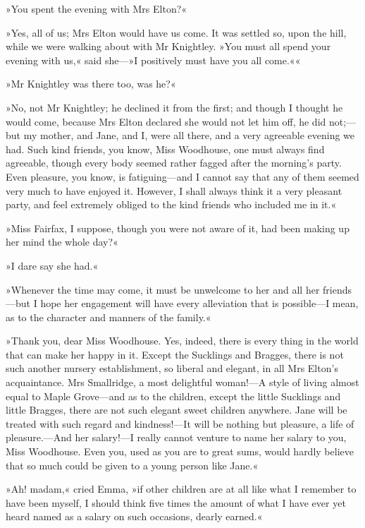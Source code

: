 »You spent the evening with Mrs Elton?«

»Yes, all of us; Mrs Elton would have us come. It was settled so, upon the hill, while we were walking about with Mr Knightley. »You must all spend your evening with us,« said she—»I positively must have you all come.««

»Mr Knightley was there too, was he?«

»No, not Mr Knightley; he declined it from the first; and though I thought he would come, because Mrs Elton declared she would not let him off, he did not;—but my mother, and Jane, and I, were all there, and a very agreeable evening we had. Such kind friends, you know, Miss Woodhouse, one must always find agreeable, though every body seemed rather fagged after the morning's party. Even pleasure, you know, is fatiguing—and I cannot say that any of them seemed very much to have enjoyed it. However, I shall always think it a very pleasant party, and feel extremely obliged to the kind friends who included me in it.«

»Miss Fairfax, I suppose, though you were not aware of it, had been making up her mind the whole day?«

»I dare say she had.«

»Whenever the time may come, it must be unwelcome to her and all her friends—but I hope her engagement will have every alleviation that is possible—I mean, as to the character and manners of the family.«

»Thank you, dear Miss Woodhouse. Yes, indeed, there is every thing in the world that can make her happy in it. Except the Sucklings and Bragges, there is not such another nursery establishment, so liberal and elegant, in all Mrs Elton's acquaintance. Mrs Smallridge, a most delightful woman!—A style of living almost equal to Maple Grove—and as to the children, except the little Sucklings and little Bragges, there are not such elegant sweet children anywhere. Jane will be treated with such regard and kindness!—It will be nothing but pleasure, a life of pleasure.—And her salary!—I really cannot venture to name her salary to you, Miss Woodhouse. Even you, used as you are to great sums, would hardly believe that so much could be given to a young person like Jane.«

»Ah! madam,« cried Emma, »if other children are at all like what I remember to have been myself, I should think five times the amount of what I have ever yet heard named as a salary on such occasions, dearly earned.«

